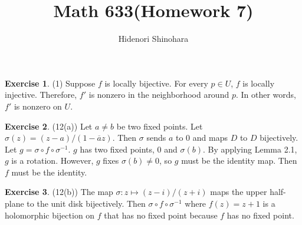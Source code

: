 \documentclass[12pt, psamsfonts]{amsart}
\theoremstyle{definition}
\newtheorem*{exer}{Exercise}
\theoremstyle{remark}
\numberwithin{equation}{section}
\begin{document}
\title{Math 633(Homework 7)}
\author{Hidenori Shinohara}
\maketitle

\begin{exer}{(1)}
  Suppose $f$ is locally bijective.
  For every $p \in U$, $f$ is locally injective.
  Therefore, $f'$ is nonzero in the neighborhood around $p$.
  In other words, $f'$ is nonzero on $U$.

\end{exer}

\begin{exer}{(12(a))}
  Let $a \ne b$ be two fixed points.
  Let $\sigma(z) = (z - a) / (1 - \overline{a}z)$.
  Then $\sigma$ sends $a$ to $0$ and maps $D$ to $D$ bijectively.
  Let $g = \sigma \circ f \circ \sigma^{-1}$.
  $g$ has two fixed points, 0 and $\sigma(b)$.
  By applying Lemma 2.1, $g$ is a rotation.
  However, $g$ fixes $\sigma(b) \ne 0$, so $g$ must be the identity map.
  Then $f$ must be the identity.
\end{exer}

\begin{exer}{(12(b))}
  The map $\sigma: z \mapsto (z - i) / (z + i)$ maps the upper half-plane to the unit disk bijectively.
  Then $\sigma \circ f \circ \sigma^{-1}$ where $f(z) = z + 1$ is a holomorphic bijection on $f$ that has no fixed point because $f$ has no fixed point.
\end{exer}
\end{document}
